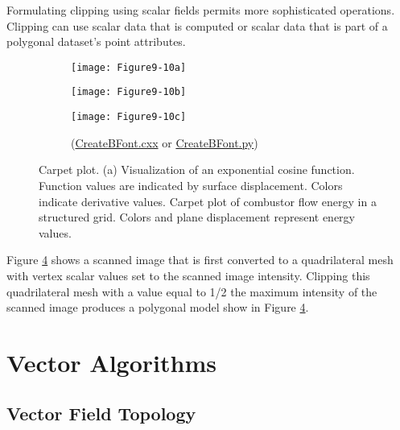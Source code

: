 Formulating clipping using scalar fields permits more sophisticated operations. Clipping can use scalar data that is computed or scalar data that is part of a polygonal dataset's point attributes.

\begin{figure}[!htb]
    \centering
    \begin{subfigure}{0.41\linewidth}
        \centering
        \texttt{[image: Figure9-10a]}
        \caption*{}\label{fig:Figure9-10a}
    \end{subfigure}
    \hfill
    \begin{subfigure}{0.16\linewidth}
        \centering
        \texttt{[image: Figure9-10b]}
        \caption*{}\label{fig:Figure9-10b}
    \end{subfigure}%
    \hfill
    \begin{subfigure}{0.41\linewidth}
        \centering
        \texttt{[image: Figure9-10c]}
        \caption*{(\href{https://lorensen.github.io/VTKExamples/site/Cxx/VisualizationAlgorithms/CreateBFont/}{CreateBFont.cxx} or \href{https://lorensen.github.io/VTKExamples/site/Python/VisualizationAlgorithms/CreateBFont/}{CreateBFont.py})}\label{fig:Figure9-10c}
    \end{subfigure}%
    \caption{Carpet plot. (a) Visualization of an exponential cosine function. Function values are indicated by surface displacement. Colors indicate derivative values. Carpet plot of combustor flow energy in a structured grid. Colors and plane displacement represent energy values.}
    \label{fig:Figure9-10}
\end{figure}

Figure \ref{fig:Figure9-10} shows a scanned image that is first converted to a quadrilateral mesh with vertex scalar values set to the scanned image intensity. Clipping this quadrilateral mesh with a value equal to 1/2 the maximum intensity of the scanned image produces a polygonal model show in Figure \ref{fig:Figure9-10}.

\section{Vector Algorithms}

\subsection{Vector Field Topology}


